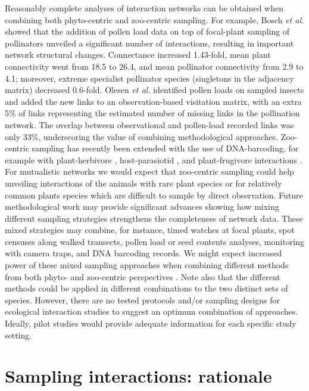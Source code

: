 \documentclass[12pt]{article}
\begin{document}
Reasonably complete analyses of interaction networks can be obtained when combining both phyto-centric and zoo-centric sampling. For example, Bosch \emph{et al.} \citeyearpar{Bosch:2009jga} showed that the addition of pollen load data on top of focal-plant sampling of pollinators unveiled a significant number of interactions, resulting in important network structural changes. Connectance increased 1.43-fold, mean plant connectivity went from 18.5 to 26.4, and mean pollinator connectivity from 2.9 to 4.1; moreover, extreme specialist pollinator species (singletons in the adjacency matrix) decreased 0.6-fold. Olesen \emph{et al.}\citeyearpar[][]{Olesen:2011a} identified pollen loads on sampled insects and added the new links to an observation-based visitation matrix, with an extra 5\% of links representing the estimated number of missing links in the pollination network. The overlap between observational and pollen-load recorded links was only 33\%, underscoring the value of combining methodological approaches. Zoo-centric sampling has recently been extended with the use of DNA-barcoding, for example with plant-herbivore \citep{JuradoRivera:2009cp}, host-parasiotid \citep{Wirta:2014aa}, and plant-frugivore interactions \citep{GonzalezVaro:2014ij}. For mutualistic networks we would expect that zoo-centric sampling could help unveiling interactions of the animals with rare plant species or for relatively common plants species which are difficult to sample by direct observation. Future methodological work may provide significant advances showing how mixing different sampling strategies strengthens the completeness of network data. These mixed strategies may combine, for instance, timed watches at focal plants, spot censuses along walked transects, pollen load or seed contents analyses, monitoring with camera traps, and DNA barcoding records. We might expect increased power of these mixed sampling approaches when combining different methods from both phyto- and zoo-centric perspectives \citep{Bosch:2009jga,Bluthgen:2010p9}. Note also that the different methods could be applied in different combinations to the two distinct sets of species. However, there are no tested protocols and\slash or sampling designs for ecological interaction studies to suggest an optimum combination of approaches. Ideally, pilot studies would provide adequate information for each specific study setting.

\section*{Sampling interactions: rationale}
\label{samplinginteractions:rationale}
\end{document}
